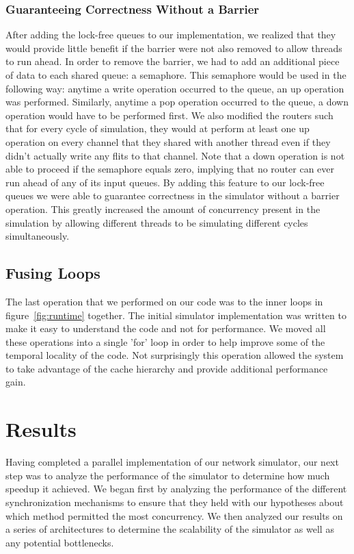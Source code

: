\documentclass{article}
\begin{document}
\begin{multicols}{2}
\subsubsection{Guaranteeing Correctness Without a Barrier}
After adding the lock-free queues to our implementation, we realized that
they would provide little benefit if the barrier were not also removed to
allow threads to run ahead.  In order to remove the barrier, we had to add
an additional piece of data to each shared queue: a semaphore.  This
semaphore would be used in the following way: anytime a write operation
occurred to the queue, an up operation was performed.  Similarly, anytime
a pop operation occurred to the queue, a down operation would have to be
performed first.  We also modified the routers such that for every cycle
of simulation, they would at perform at least one up operation on every
channel that they shared with another thread even if they didn't actually
write any flits to that channel.  Note that a down operation is not able
to proceed if the semaphore equals zero, implying that no router can ever
run ahead of any of its input queues.  By adding this feature to our
lock-free queues we were able to guarantee correctness in the simulator
without a barrier operation.  This greatly increased the amount of
concurrency present in the simulation by allowing different threads to be
simulating different cycles simultaneously.

\subsection{Fusing Loops}
The last operation that we performed on our code was to the inner loops in figure~\ref{fig:runtime} together.  The initial simulator implementation was written to make it
easy to understand the code and not for performance.  We moved all these operations into a single
'for' loop in order to help improve some of the temporal locality of the
code.  Not surprisingly this operation allowed the system to take
advantage of the cache hierarchy and provide additional performance gain.

\section{Results \label{results}}
Having completed a parallel implementation of our network simulator, our
next step was to analyze the performance of the simulator to determine how
much speedup it achieved.  We began first by analyzing the performance of
the different synchronization mechanisms to ensure that they held with our
hypotheses about which method permitted the most concurrency.  We then analyzed
our results on a series of architectures to determine the scalability of
the simulator as well as any potential bottlenecks.


\end{multicols}
\end{document}
